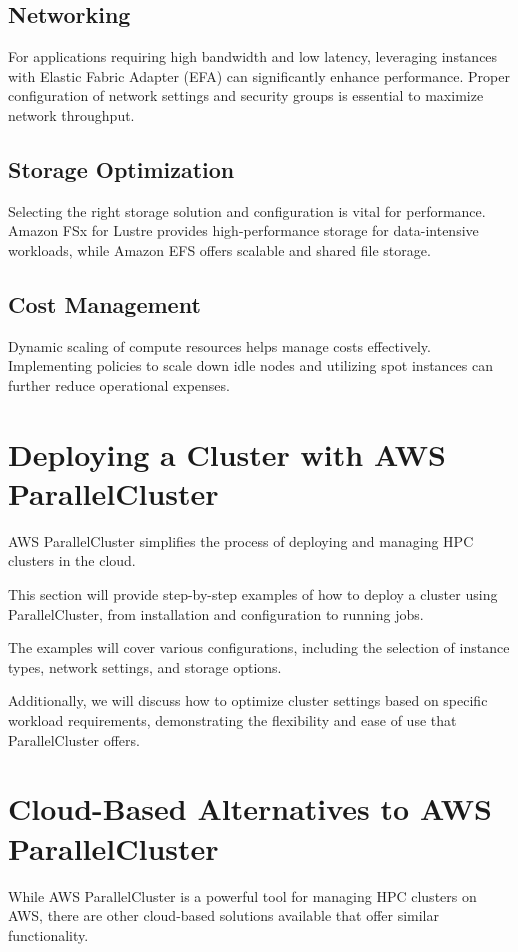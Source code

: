 \subsection{Networking}

For applications requiring high bandwidth and low latency, leveraging instances with Elastic Fabric Adapter (EFA) can significantly enhance performance. Proper configuration of network settings and security groups is essential to maximize network throughput.

\subsection{Storage Optimization}

Selecting the right storage solution and configuration is vital for performance. Amazon FSx for Lustre provides high-performance storage for data-intensive workloads, while Amazon EFS offers scalable and shared file storage.

\subsection{Cost Management}

Dynamic scaling of compute resources helps manage costs effectively. Implementing policies to scale down idle nodes and utilizing spot instances can further reduce operational expenses.

\section{Deploying a Cluster with AWS ParallelCluster}
AWS ParallelCluster simplifies the process of deploying and managing HPC clusters in the cloud. 

This section will provide step-by-step examples of how to deploy a cluster using ParallelCluster, from installation and configuration to running jobs. 

The examples will cover various configurations, including the selection of instance types, network settings, and storage options. 

Additionally, we will discuss how to optimize cluster settings based on specific workload requirements, demonstrating the flexibility and ease of use that ParallelCluster offers.

\section{Cloud-Based Alternatives to AWS ParallelCluster}
While AWS ParallelCluster is a powerful tool for managing HPC clusters on AWS, there are other cloud-based solutions available that offer similar functionality. 

